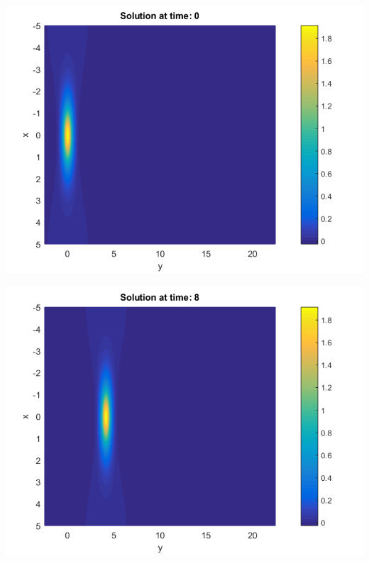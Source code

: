 \documentclass[a0,portrait]{a0poster}
\begin{document}
\begin{multicols}{2}
\begin{center}
	\begin{minipage}[b]{0.30\linewidth}
		\includegraphics[width=\linewidth]{figures/Solution_bt3_t=0.png}
	\end{minipage}	
	\begin{minipage}[b]{0.30\linewidth}
		\includegraphics[width=\linewidth]{figures/Solution_bt3_t=8.png}
	\end{minipage}	
	\begin{minipage}[b]{0.30\linewidth}

\end{minipage}
\end{center}
\end{multicols}
\end{document}
